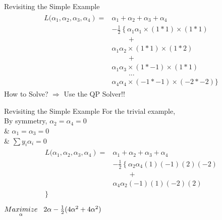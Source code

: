 \documentclass{beamer}
\begin{document}
\begin{frame}{Revisiting the Simple Example}
\begin{align*}
\begin{aligned}
\left.L(\alpha_{1},\alpha_{2},\alpha_{3},\alpha_{4}\right)=& \alpha_{1}+\alpha_{2}+\alpha_{3}+\alpha_{4} \\
&-\frac{1}{2}\left\{\alpha_{1} \alpha_{1}\times(1*1) \times(1 * 1)\right.\\
&\hspace{1cm} + \\
& \alpha_{1} \alpha_{2} \times(1*1) \times(1*2) \\
&\hspace{1cm}+\\
& \alpha_{1} \alpha_{3} \times(1*-1)\times(1*1)\\
& \hspace{1cm} ... \\
& \alpha_4\alpha_4 \times(-1*-1)\times(-2*-2)
\}
\end{aligned}
\end{align*}
How to Solve? $\Rightarrow$ Use the QP Solver!!
\end{frame}

\begin{frame}{Revisiting the Simple Example}
For the trivial example, \\
\hspace{2cm} By symmetry, $\alpha_{2} = \alpha_{4} = 0 $\\
\hspace{2cm} \& $\alpha_1 = \alpha_3  = 0$ \\
\hspace{2cm} \& $\sum y_i\alpha_i = 0$
\begin{align*}
\begin{aligned}
\left.L(\alpha_{1},\alpha_{2},\alpha_{3},\alpha_{4}\right)=& \alpha_{1}+\alpha_{2}+\alpha_{3}+\alpha_{4} \\
&-\frac{1}{2}\left\{\alpha_{2} \alpha_{4}(1)(-1)(2)(-2) \right. \\
&\hspace{1cm} +\\
& \alpha_{4} \alpha_{2}(-1)(1)(-2)(2) \\
\}\\
\end{aligned}
\end{align*}
\hspace{2cm} $\underset{\alpha}{Maximize} \hspace{3mm} 2\alpha - \frac{1}{2}(4\alpha^{2} + 4\alpha^{2})$
\end{frame}
\end{document}
